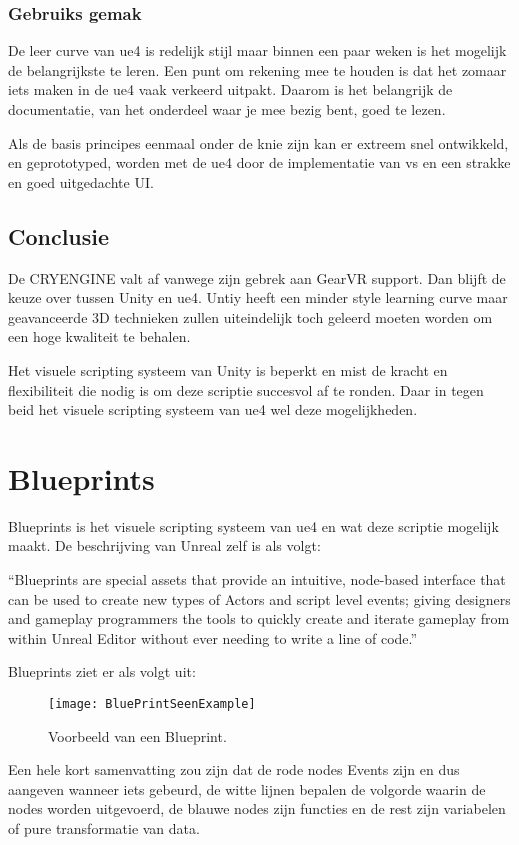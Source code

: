 \subsubsection{Gebruiks gemak}
De leer curve van \gls{ue4} is redelijk stijl maar binnen een paar weken is het mogelijk de belangrijkste te leren. Een punt om rekening mee te houden is dat het zomaar iets maken in de \gls{ue4} vaak verkeerd uitpakt. Daarom is het belangrijk de documentatie, van het onderdeel waar je mee bezig bent, goed te lezen.

Als de basis principes eenmaal onder de knie zijn kan er extreem snel ontwikkeld, en geprototyped, worden met de \gls{ue4} door de implementatie van \gls{vs} en een strakke en goed uitgedachte UI.

\subsection{Conclusie}
De CRYENGINE valt af vanwege zijn gebrek aan GearVR support. Dan blijft de keuze over tussen Unity en \gls{ue4}. Untiy heeft een minder style learning curve maar geavanceerde 3D technieken zullen uiteindelijk toch geleerd moeten worden om een hoge kwaliteit te behalen. 

Het visuele scripting systeem van Unity is beperkt en mist de kracht en flexibiliteit die nodig is om deze scriptie succesvol af te ronden. Daar in tegen beid het visuele scripting systeem van \gls{ue4} wel deze mogelijkheden.

\section{Blueprints}
Blueprints is het visuele scripting systeem van \gls{ue4} en wat deze scriptie mogelijk maakt. De beschrijving van Unreal zelf is als volgt:

“Blueprints are special assets that provide an intuitive, node-based interface that can be used to create new types of Actors and script level events; giving designers and gameplay programmers the tools to quickly create and iterate gameplay from within Unreal Editor without ever needing to write a line of code.”

Blueprints ziet er als volgt uit:

\begin{figure}[!ht]
  \centering
    \texttt{[image: BluePrintSeenExample]}
    \caption{Voorbeeld van een Blueprint.}
\end{figure}

Een hele kort samenvatting zou zijn dat de rode nodes Events zijn en dus aangeven wanneer iets gebeurd, de witte lijnen bepalen de volgorde waarin de nodes worden uitgevoerd, de blauwe nodes zijn functies en de rest zijn variabelen of pure transformatie van data.
